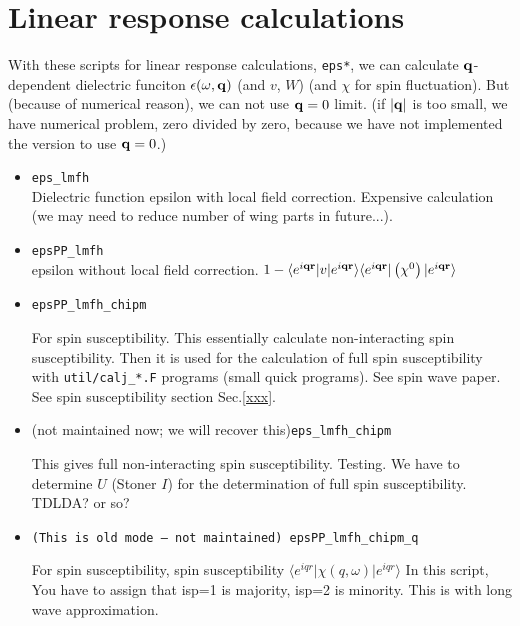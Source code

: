 \documentclass[a4paper,10pt,epsf,fleqn]{article}
\newcommand{\bfq}{{\bf q}}
\newcommand{\bfr}{{\bf r}}
\newcommand{\raw}[1]{{\tt #1}}
\newcommand{\eiqr}{e^{i \bfq \bfr}}
\begin{document}
\newpage
\section{Linear response calculations}
\label{linearr}
With these scripts for linear response calculations, \verb#eps*#,
we can calculate
$\bfq$-dependent dielectric funciton
$\epsilon(\omega ,\bfq)$ (and $v$, $W$) (and $\chi$ for spin fluctuation).
But (because of numerical reason), we can not use $\bfq = 0$ limit.
(if $|\bfq|$ is too small, we have numerical problem, zero divided by
zero, because we have not implemented the version to use $\bfq=0$.)
\begin{itemize}
\item \raw{eps\_lmfh}\\
   Dielectric function epsilon with local field correction.
   Expensive calculation (we may need to reduce number of wing parts in
      future...).

\item \raw{epsPP\_lmfh}\\
   epsilon without local field correction.
   $1- \langle \eiqr |v|\eiqr\rangle  \langle \eiqr| \left( \chi^{0} \right) |\eiqr\rangle$


\item \raw{epsPP\_lmfh\_chipm}

    For spin susceptibility. This essentially calculate non-interacting spin susceptibility.
    Then it is used for the calculation of full spin susceptibility with \verb#util/calj_*.F# programs
    (small quick programs). See spin wave paper.
    See spin susceptibility section Sec.\ref{xxx}.

\item (not maintained now; we will recover this)\raw{eps\_lmfh\_chipm}

    This gives full non-interacting spin susceptibility. Testing.
    We have to determine $U$ (Stoner $I$) for the determination of full spin susceptibility.
    TDLDA? or so?


\item \raw{(This is old mode --- not maintained) epsPP\_lmfh\_chipm\_q}

  For spin susceptibility, 
  spin susceptibility $\langle e^{iqr}| \chi(q,\omega) |e^{iqr} \rangle$
  In this script, You have to assign that isp=1 is majority, isp=2 is minority.
  This is with long wave approximation.  

\end{itemize}
\end{document}
